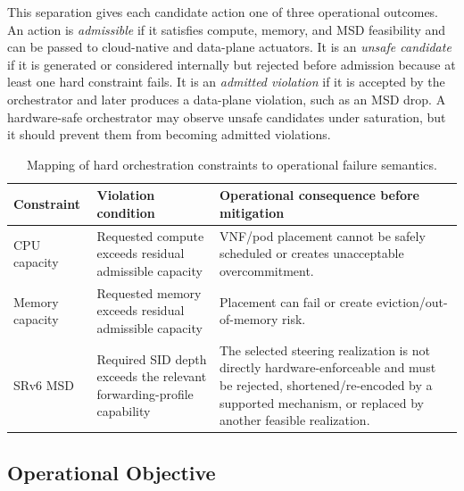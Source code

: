 \documentclass[final,5p]{elsarticle}
\newenvironment{revision}{\color{red}}{}
\begin{document}
This separation gives each candidate action one of three operational outcomes. An action is \textit{admissible} if it satisfies compute, memory, and MSD feasibility and can be passed to cloud-native and data-plane actuators. It is an \textit{unsafe candidate} if it is generated or considered internally but rejected before admission because at least one hard constraint fails. It is an \textit{admitted violation} if it is accepted by the orchestrator and later produces a data-plane violation, such as an MSD drop. A hardware-safe orchestrator may observe unsafe candidates under saturation, but it should prevent them from becoming admitted violations.

\begin{revision}
\begin{table}[t]
\centering
\caption{Mapping of hard orchestration constraints to operational failure semantics.}
\label{tab:hard_constraint_failure_mapping}
\renewcommand{\arraystretch}{1.08}
\scriptsize
\begin{tabularx}{\columnwidth}{p{1.8cm}XX}
\toprule
\textbf{Constraint} & \textbf{Violation condition} & \textbf{Operational consequence before mitigation} \\
\midrule
CPU capacity & Requested compute exceeds residual admissible capacity & VNF/pod placement cannot be safely scheduled or creates unacceptable overcommitment. \\
Memory capacity & Requested memory exceeds residual admissible capacity & Placement can fail or create eviction/out-of-memory risk. \\
SRv6 MSD & Required SID depth exceeds the relevant forwarding-profile capability & The selected steering realization is not directly hardware-enforceable and must be rejected, shortened/re-encoded by a supported mechanism, or replaced by another feasible realization. \\
\bottomrule
\end{tabularx}
\end{table}
\end{revision}

\subsection{Operational Objective}
\label{subsec:objective_metrics}
\end{document}
